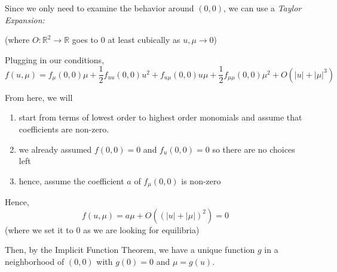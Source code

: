 \documentclass[12pt]{article}
\newcommand{\R}{\mathbb{R}}
\newcommand{\abs}[1]{\left\vert #1 \right\vert}
\begin{document}
Since we only need to examine the behavior around $(0, 0)$, we can use a \emph{Taylor Expansion:}

(where $O: \R^2 \to \R$ goes to $0$ at least cubically as $u, \mu \to 0$)

Plugging in our conditions,
\[f(u, \mu) = f_{\mu}(0, 0) \mu + \frac{1}{2}f_{uu}(0,0)u^2 + f_{u\mu}(0, 0)u\mu + \frac{1}{2}f_{\mu\mu}(0, 0)\mu^2 + O({\abs{u}+ \abs{\mu}}^3)\]

From here, we will
\begin{enumerate}
    \item start from terms of lowest order to highest order monomials and assume that coefficients are non-zero.
    \item we already assumed $f(0, 0) = 0$ and $f_u(0, 0) = 0$ so there are no choices left
    \item hence, assume the coefficient $a$ of $f_{\mu}(0, 0)$ is non-zero
\end{enumerate}

Hence,
\[f(u, \mu) = a\mu + O((\abs{u} + \abs{\mu})^2) = 0\]
(where we set it to $0$ as we are looking for equilibria)

Then, by the Implicit Function Theorem, we have a unique function $g$ in a neighborhood of $(0, 0)$ with $g(0) = 0$ and $\mu = g(u)$.
\end{document}
